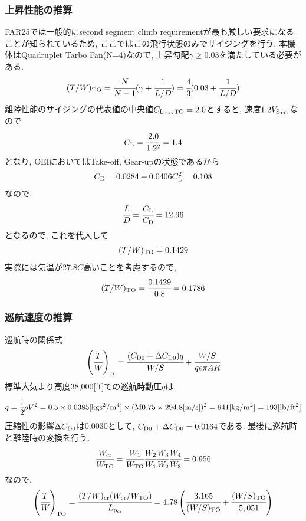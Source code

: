 \documentclass[12pt]{jsarticle}
\begin{document}
\subsubsection{上昇性能の推算}
FAR25では一般的にsecond segment climb requirementが最も厳しい要求になることが知られているため, ここではこの飛行状態のみでサイジングを行う. 本機体はQuadruplet Tarbo Fan(N=4)なので, 上昇勾配$\gamma \ge 0.03$を満たしている必要がある.
\begin{eqnarray*}
(T/W)_{\rm TO} = \cfrac{N}{N-1}(\gamma + \cfrac{1}{L/D}) = \cfrac{4}{3}(0.03 + \cfrac{1}{L/D})
\end{eqnarray*}
離陸性能のサイジングの代表値の中央値$C_{\rm L_{max}TO} = 2.0$とすると, 速度$1.2V_{\rm S_{TO}}$なので
\begin{eqnarray*}
C_{\rm L} = \cfrac{2.0}{1.2^2}=1.4
\end{eqnarray*}
となり, OEIにおいてはTake-off, Gear-upの状態であるから
\begin{eqnarray*}
C_{\rm D} = 0.0284 + 0.0406 C_{\rm L}^2 = 0.108
\end{eqnarray*}
なので,
\begin{eqnarray*}
\cfrac{L}{D} = \cfrac{C_{\rm L}}{C_{\rm D}} = 12.96
\end{eqnarray*}
となるので, これを代入して
\begin{eqnarray*}
(T/W)_{\rm TO} = 0.1429
\end{eqnarray*}
実際には気温が27.8$C$高いことを考慮するので,
\begin{eqnarray*}
(T/W)_{\rm TO} = \cfrac{0.1429}{0.8} = 0.1786
\end{eqnarray*}

\subsubsection{巡航速度の推算}
巡航時の関係式
\begin{eqnarray*}
\left(\cfrac{T}{W}\right)_{\rm cr} = \cfrac{(C_{\rm D0}+\Delta C_{\rm D0}) q}{W/S} + \cfrac{W/S}{qe\pi AR}
\end{eqnarray*}
標準大気より高度38,000[ft]での巡航時動圧$q$は,
\begin{eqnarray*}
q = \cfrac{1}{2}\rho V^2 = 0.5 \times 0.0385 [\rm kg s^2 / m^4 ] \times (M0.75 \times 294.8 [\rm m/s])^2 = 941 [\rm kg / m^2] = 193 [\rm lb / ft^2]
\end{eqnarray*}
圧縮性の影響$\Delta C_{\rm D0}$は0.0030として, $C_{\rm D0} + \Delta C_{\rm D0} = 0.0164$である. 最後に巡航時と離陸時の変換を行う.
\begin{eqnarray*}
\cfrac{W_{\rm cr}}{W_{\rm TO}} = \cfrac{W_1}{W_{\rm TO}}\cfrac{W_2}{W_1}\cfrac{W_3}{W_2}\cfrac{W_4}{W_3} = 0.956
\end{eqnarray*}
なので, 
\begin{eqnarray*}
\left(\cfrac{T}{W}\right)_{\rm TO} = \cfrac{(T/W)_{\rm cr}(W_{\rm cr}/W_{\rm TO})}{L_{\rm p_{cr}}} = 4.78\left(\cfrac{3.165}{(W/S)_{\rm TO}} + \cfrac{(W/S)_{\rm TO}}{5,051}\right)
\end{eqnarray*}
\end{document}
